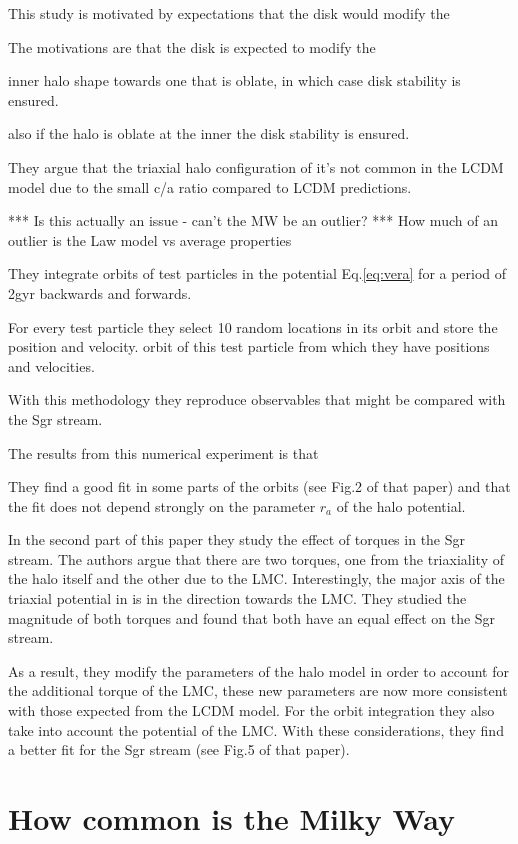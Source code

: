 \documentclass[12pt]{article}
\begin{document}
This study is motivated by expectations that the disk would modify the 

The motivations are that the disk is expected
 to modify the

 inner halo shape towards one that is oblate, in which case disk stability 
is ensured.  

also if the
halo is oblate at the inner the disk stability is ensured. 

They
argue that the triaxial halo configuration of \citep{Law10} it's
not common in the LCDM model due to the small c/a ratio compared to
LCDM predictions.

*** Is this actually an issue - can’t the MW be an outlier?   
***  How much of an outlier is the Law model vs average properties


They integrate orbits of test particles in the potential Eq.\ref{eq:vera} for a period
of 2gyr backwards and forwards. 

For every test particle they select 10 random locations 
in its orbit and store the position and velocity. 
orbit of this test particle from which they have positions and velocities.

 With this methodology they reproduce observables that might be compared with 
the Sgr stream.

The results from this numerical experiment is that 

They find  a good fit in some
parts of the orbits (see Fig.2 of that paper) and that the fit does not depend
strongly on the parameter $r_a$ of the halo potential.

In the second part of this paper they study the effect of torques in the Sgr
stream. The authors argue that there are two torques, one from the triaxiality
of the halo itself and the other due to the LMC. Interestingly, the major
axis of the triaxial potential in \citep{Law10} is in the direction towards
 the LMC. They studied the magnitude of both torques and found that both
have an equal effect on the Sgr stream.

As a result, they modify the parameters of the halo model in order to account
for the additional torque of the LMC, these new parameters are now more consistent
 with those expected from the LCDM model. For the orbit integration they also take
into account the potential of the LMC. With these considerations, they find a better fit for  the Sgr
stream (see Fig.5 of that paper).

\section{How common is the Milky Way}
\end{document}
